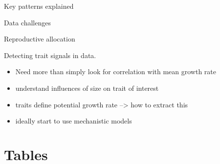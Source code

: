 \documentclass[12pt, a4paper]{article}
\begin{document}
Key patterns explained

Data challenges

Reproductive allocation



Detecting trait signals in data.

\begin{itemize}
\item  Need more than simply look for correlation with mean growth rate
\item
  understand influences of size on trait of interest
\item
  traits define potential growth rate --\textgreater{} how to extract
  this
\item
  ideally start to use mechanistic models
\end{itemize}



\newpage

\section{Tables}\label{tables}
\end{document}

